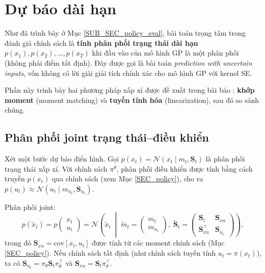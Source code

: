 \section{Dự báo dài hạn}
\label{SEC_predictions}

Như đã trình bày ở Mục \ref{SUB_SEC_policy_eval}, bài toán trọng tâm trong đánh giá chính sách là \textbf{tính phân phối trạng thái dài hạn} $p(x_1), p(x_2), \dots, p(x_T)$ khi đầu vào của mô hình GP là một phân phối (không phải điểm tất định). Đây được gọi là bài toán \textit{prediction with uncertain inputs}, vốn không có lời giải giải tích chính xác cho mô hình GP với kernel SE.

Phần này trình bày hai phương pháp xấp xỉ được đề xuất trong bài báo \cite{Deisenroth_2015}: \textbf{khớp moment} (moment matching) và \textbf{tuyến tính hóa} (linearization), sau đó so sánh chúng.

\subsection{Phân phối joint trạng thái--điều khiển}
\label{SUB_SEC_joint_distribution}

Xét một bước dự báo điển hình. Gọi $p(x_t) = \mathcal{N}(x_t \mid m_t, \mathbf{S}_t)$ là phân phối trạng thái xấp xỉ. Với chính sách $\pi^\theta$, phân phối điều khiển được tính bằng cách truyền $p(x_t)$ qua chính sách (xem Mục \ref{SEC_policy}), cho ra $p(u_t) \approx \mathcal{N}(u_t \mid m_{u_t}, \mathbf{S}_{u_t})$.

Phân phối joint:
\begin{equation}
    p(\tilde{x}_t) = p\!\begin{pmatrix} x_t \\ u_t \end{pmatrix} = \mathcal{N}\!\left(\tilde{x}_t \;\middle|\; \tilde{m}_t = \begin{pmatrix}m_t \\ m_{u_t}\end{pmatrix},\; \tilde{\mathbf{S}}_t = \begin{pmatrix}\mathbf{S}_t & \mathbf{S}_{xu} \\ \mathbf{S}_{xu}^\top & \mathbf{S}_{u_t}\end{pmatrix}\right),
    \label{joint_state_control}
\end{equation}
trong đó $\mathbf{S}_{xu} = \mathrm{cov}[x_t, u_t]$ được tính từ các moment chính sách (Mục \ref{SEC_policy}). Nếu chính sách tất định (như chính sách tuyến tính $u_t = \pi(x_t)$), ta có $\mathbf{S}_{u_t} = \pi_\theta \mathbf{S}_t \pi_\theta^\top$ và $\mathbf{S}_{xu} = \mathbf{S}_t \pi_\theta^\top$.

